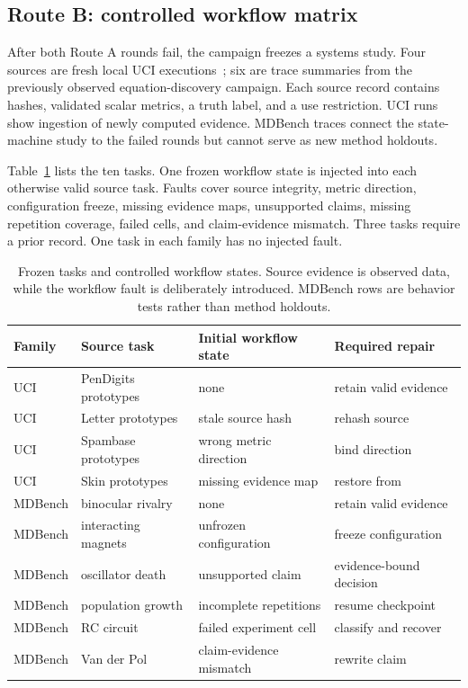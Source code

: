 \subsection{Route B: controlled workflow matrix}

After both Route A rounds fail, the campaign freezes a systems study. Four
sources are fresh local UCI executions~\cite{dua2019uci}; six are trace
summaries from the previously observed equation-discovery campaign. Each
source record contains hashes, validated scalar metrics, a truth label, and a
use restriction. UCI runs show ingestion of newly computed evidence. MDBench
traces connect the state-machine study to the failed rounds but cannot serve
as new method holdouts.

Table~\ref{tab:task_matrix} lists the ten tasks. One frozen workflow state is
injected into each otherwise valid source task. Faults cover source integrity,
metric direction, configuration freeze, missing evidence maps, unsupported
claims, missing repetition coverage, failed cells, and claim-evidence
mismatch. Three tasks require a prior \vault{} record. One task in each family
has no injected fault.

\begin{table}[t]
\centering
\caption{Frozen tasks and controlled workflow states. Source evidence is
observed data, while the workflow fault is deliberately introduced. MDBench
rows are behavior tests rather than method holdouts.}
\label{tab:task_matrix}
\small
\begin{tabular}{llll}
\toprule
Family & Source task & Initial workflow state & Required repair \\
\midrule
UCI & PenDigits prototypes & none & retain valid evidence \\
UCI & Letter prototypes & stale source hash & rehash source \\
UCI & Spambase prototypes & wrong metric direction & bind direction \\
UCI & Skin prototypes & missing evidence map & restore from \vault{} \\
\midrule
MDBench & binocular rivalry & none & retain valid evidence \\
MDBench & interacting magnets & unfrozen configuration & freeze configuration \\
MDBench & oscillator death & unsupported claim & evidence-bound decision \\
MDBench & population growth & incomplete repetitions & resume checkpoint \\
MDBench & RC circuit & failed experiment cell & classify and recover \\
MDBench & Van der Pol & claim-evidence mismatch & rewrite claim \\
\bottomrule
\end{tabular}
\end{table}

